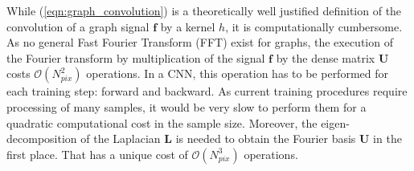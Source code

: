 \documentclass[final,twocolumn,3p,times,authoryear]{elsarticle}
\newcommand{\TK}[1]{{\color{red}{TK:#1}}}
\newcommand{\eqnref}[1]{(\ref{eqn:#1})}
\renewcommand{\b}[1]{{\bm{#1}}}   %
\newcommand{\1}{\b{1}}              %
\newcommand{\0}{\b{0}}              %
\renewcommand{\L}{\b{L}}
\newcommand{\U}{\b{U}}
\newcommand{\f}{\b{f}}
\newcommand{\bO}{\mathcal{O}}
\begin{document}
While \eqnref{graph_convolution} is a theoretically well justified definition of the convolution of a graph signal $\f$ by a kernel $h$, it is computationally cumbersome.
As no general Fast Fourier Transform (FFT) exist for graphs, the execution of the Fourier transform by multiplication of the signal $\f$ by the dense matrix $\U$ costs $\bO(N_{pix}^2)$ operations.
In a CNN, this operation has to be performed for each training step: forward and backward.
As current training procedures require processing of many samples, it would be very slow to perform them for a quadratic computational cost in the sample size.
Moreover, the eigen-decomposition of the Laplacian $\L$ is needed to obtain the Fourier basis $\U$ in the first place.
That has a unique cost of $\bO(N_{pix}^3)$ operations.
\end{document}
